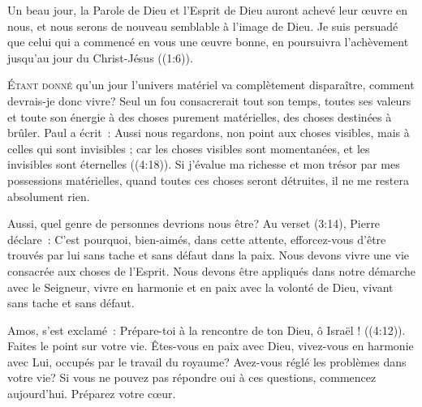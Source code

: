 Un beau jour, la Parole de Dieu et l'Esprit de Dieu auront achevé leur \oe{}uvre
 en nous, et nous serons de nouveau semblable à l'image de Dieu.
 \og Je suis persuadé que celui qui a commencé en vous une \oe{}uvre bonne,
 en poursuivra l'achèvement jusqu'au jour du Christ-Jésus \fg{}
 ((1:6)).

\dvrule






\lettrine{É}{tant donné} qu'un jour l'univers matériel va complètement
 disparaître, comment devrais-je donc vivre? Seul un fou consacrerait
 tout son temps, toutes ses valeurs et toute son énergie à des choses purement
 matérielles, des choses destinées à brûler. Paul a écrit~: 
 \og Aussi nous regardons, non point aux choses visibles,
 mais à celles qui sont invisibles ; car les choses visibles sont momentanées,
 et les invisibles sont éternelles \fg{} ((4:18)).
 Si j'évalue ma richesse et mon trésor par mes possessions matérielles,
 quand toutes ces choses seront détruites, il ne me restera absolument rien.

Aussi, quel genre de personnes devrions nous être? Au verset
 (3:14),
 Pierre déclare~: 
 \og C'est pourquoi, bien-aimés, dans cette attente,
 efforcez-vous d'être trouvés par lui sans tache et sans défaut
 dans la paix. \fg{}
 Nous devons vivre une vie consacrée aux choses de l'Esprit.
 Nous devons être appliqués dans notre démarche avec le Seigneur,
 vivre en harmonie et en paix avec la volonté de Dieu,
 vivant sans tache et sans défaut.


Amos, s'est exclamé~: 
 \og Prépare-toi à la rencontre de ton Dieu, ô Israël ! \fg{}
 ((4:12)).
 Faites le point sur votre vie. Êtes-vous en paix avec Dieu,
 vivez-vous en harmonie avec Lui, occupés par le travail du royaume?
 Avez-vous réglé les problèmes dans votre vie? Si vous ne pouvez pas répondre
 \og oui \fg{} à ces questions, commencez aujourd'hui. Préparez votre c\oe{}ur.

